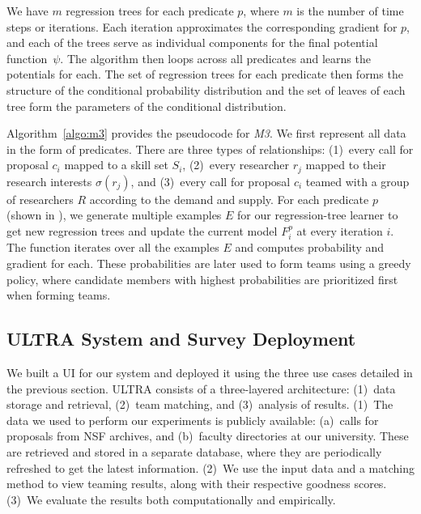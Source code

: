 We have $m$ regression trees for each predicate $p$, where $m$ is the number of time steps or iterations. Each iteration approximates the corresponding gradient for $p$, and each of the trees serve as individual components for the final potential function~$\psi$. The algorithm  then loops across all predicates and learns the potentials for each. The set of regression trees for each predicate then forms the structure of the conditional probability distribution and the set of leaves of each tree form the parameters of the conditional distribution. 

Algorithm~\ref{algo:m3} provides the pseudocode for {\it M3}. We first represent all data in the form of predicates. There are three types of relationships: (1)~every call for proposal $c_i$ mapped to a skill set $S_i$, (2)~every researcher $r_j$ mapped to their research interests $\sigma(r_j)$, and (3)~every call for proposal $c_i$ teamed with a group of researchers $R$ according to the demand and supply. For each predicate $p$ (shown in ), we generate multiple examples $E$ for our regression-tree learner to get new regression trees and update the current model $F^p_i$ at every iteration $i$. The function  iterates over all the examples $E$ and computes probability and gradient for each. These probabilities are later used to form teams using a greedy policy, where candidate members with highest probabilities are prioritized first when forming teams.


\subsection{ULTRA System and Survey Deployment}
We built a UI for our system and deployed it using the three use cases detailed in the previous section. %
ULTRA consists of a three-layered architecture: (1)~data storage and retrieval, (2)~team matching, and (3)~analysis of results. (1)~The data we used to perform our experiments is publicly available: (a)~calls for proposals from NSF archives, and (b)~faculty directories at our university. These are retrieved and stored in a separate database, where they are periodically refreshed to get the latest information. (2)~We use the input data and a matching method to view teaming results, along with their respective goodness scores. (3)~We evaluate the results both computationally and empirically. %

